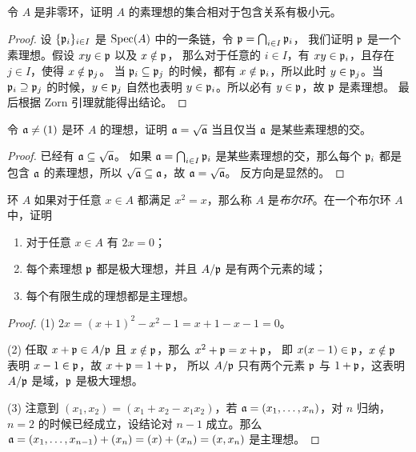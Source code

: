 \begin{problem}
  令 $A$ 是非零环，证明 $A$ 的素理想的集合相对于包含关系有极小元。
\end{problem}
\begin{proof}
  设 $\{\mathfrak{p}_i\}_{i\in I}$ 是 $\operatorname{Spec}(A)$ 中的一条链，令 $\mathfrak{p}=\bigcap_{i\in I}\mathfrak{p}_i$，
  我们证明 $\mathfrak{p}$ 是一个素理想。假设 $xy\in\mathfrak{p}$ 以及 $x\notin\mathfrak{p}$，
  那么对于任意的 $i\in I$，有 $xy\in\mathfrak{p}_i$，且存在 $j\in I$，使得 $x\notin\mathfrak{p}_j$。
  当 $\mathfrak{p}_i\subseteq \mathfrak{p}_j$ 的时候，都有 $x\notin\mathfrak{p}_i$，所以此时
  $y\in\mathfrak{p}_j$。当 $\mathfrak{p}_i\supseteq \mathfrak{p}_j$ 的时候，$y\in\mathfrak{p}_j$
  自然也表明 $y\in\mathfrak{p}_i$。所以必有 $y\in\mathfrak{p}$，故 $\mathfrak{p}$ 是素理想。
  最后根据 Zorn 引理就能得出结论。
\end{proof}

\begin{problem}
  令 $\mathfrak{a}\neq (1)$ 是环 $A$ 的理想，证明 $\mathfrak{a}=\sqrt{\mathfrak{a}}$ 当且仅当
  $\mathfrak{a}$ 是某些素理想的交。
\end{problem}
\begin{proof}
  已经有 $\mathfrak{a}\subseteq \sqrt{\mathfrak{a}}$。
  如果 $\mathfrak{a}=\bigcap_{i\in I} \mathfrak{p}_i$ 是某些素理想的交，那么每个 $\mathfrak{p}_i$ 都是
  包含 $\mathfrak{a}$ 的素理想，所以 $\sqrt{\mathfrak{a}}\subseteq \mathfrak{a}$，故 $\mathfrak{a}=\sqrt{\mathfrak{a}}$。
  反方向是显然的。
\end{proof}

\begin{problem}
  环 $A$ 如果对于任意 $x\in A$ 都满足 $x^2=x$，那么称 $A$ 是\emph{布尔环}。在一个布尔环
  $A$ 中，证明
  \begin{enumerate}
    \item 对于任意 $x\in A$ 有 $2x=0$；
    \item 每个素理想 $\mathfrak{p}$ 都是极大理想，并且 $A/\mathfrak{p}$ 是有两个元素的域；
    \item 每个有限生成的理想都是主理想。
  \end{enumerate}
\end{problem}
\begin{proof}
  (1) $2x=(x+1)^2-x^2-1=x+1-x-1=0$。

  (2) 任取 $x+\mathfrak{p}\in A/\mathfrak{p}$ 且 $x\notin\mathfrak{p}$，那么 $x^2+\mathfrak{p}=x+\mathfrak{p}$，
  即 $x(x-1)\in\mathfrak{p}$，$x\notin\mathfrak{p}$ 表明 $x-1\in\mathfrak{p}$，故 $x+\mathfrak{p}=1+\mathfrak{p}$，
  所以 $A/\mathfrak{p}$ 只有两个元素 $\mathfrak{p}$ 与 $1+\mathfrak{p}$，这表明 $A/\mathfrak{p}$
  是域，$\mathfrak{p}$ 是极大理想。

  (3) 注意到 $(x_1,x_2)=(x_1+x_2-x_1x_2)$，若 $\mathfrak{a}=(x_1,\dots,x_n)$，对 $n$
  归纳，$n=2$ 的时候已经成立，设结论对 $n-1$ 成立。那么 $\mathfrak{a}=(x_1,\dots,x_{n-1})+(x_n)
  =(x)+(x_n)=(x,x_n)$ 是主理想。
\end{proof}

